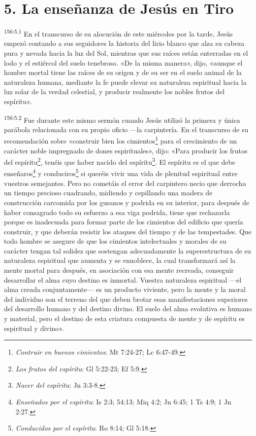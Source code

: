\section*{5. La enseñanza de Jesús en Tiro}
\par 
\textsuperscript{156:5.1} En el transcurso de su alocución de este miércoles por la tarde, Jesús empezó contando a sus seguidores la historia del lirio blanco que alza su cabeza pura y nevada hacia la luz del Sol, mientras que sus raíces están enterradas en el lodo y el estiércol del suelo tenebroso. «De la misma manera», dijo, «aunque el hombre mortal tiene las raíces de su origen y de su ser en el suelo animal de la naturaleza humana, mediante la fe puede elevar su naturaleza espiritual hacia la luz solar de la verdad celestial, y producir realmente los nobles frutos del espíritu».

\par 
\textsuperscript{156:5.2} Fue durante este mismo sermón cuando Jesús utilizó la primera y única parábola relacionada con su propio oficio ---la carpintería. En el transcurso de su recomendación sobre «construir bien los cimientos\footnote{\textit{Contruir en buenos cimientos}: Mt 7:24-27; Lc 6:47-49.} para el crecimiento de un carácter noble impregnado de dones espirituales», dijo: «Para producir los frutos del espíritu\footnote{\textit{Los frutos del espíritu}: Gl 5:22-23; Ef 5:9.}, tenéis que haber nacido del espíritu\footnote{\textit{Nacer del espíritu}: Jn 3:3-8.}. El espíritu es el que debe enseñaros\footnote{\textit{Enseñados por el espíritu}: Is 2:3; 54:13; Miq 4:2; Jn 6:45; 1 Ts 4:9; 1 Jn 2:27.} y conduciros\footnote{\textit{Conducidos por el espíritu}: Ro 8:14; Gl 5:18.} si queréis vivir una vida de plenitud espiritual entre vuestros semejantes. Pero no cometáis el error del carpintero necio que derrocha un tiempo precioso cuadrando, midiendo y cepillando una madera de construcción carcomida por los gusanos y podrida en su interior, para después de haber consagrado todo su esfuerzo a esa viga podrida, tiene que rechazarla porque es inadecuada para formar parte de los cimientos del edificio que quería construir, y que deberán resistir los ataques del tiempo y de las tempestades. Que todo hombre se asegure de que los cimientos intelectuales y morales de su carácter tengan tal solidez que sostengan adecuadamente la superestructura de su naturaleza espiritual que aumenta y se ennoblece, la cual transformará así la mente mortal para después, en asociación con esa mente recreada, conseguir desarrollar el alma cuyo destino es inmortal. Vuestra naturaleza espiritual ---el alma creada conjuntamente--- es un producto viviente, pero la mente y la moral del individuo son el terreno del que deben brotar esas manifestaciones superiores del desarrollo humano y del destino divino. El suelo del alma evolutiva es humano y material, pero el destino de esta criatura compuesta de mente y de espíritu es espiritual y divino».

